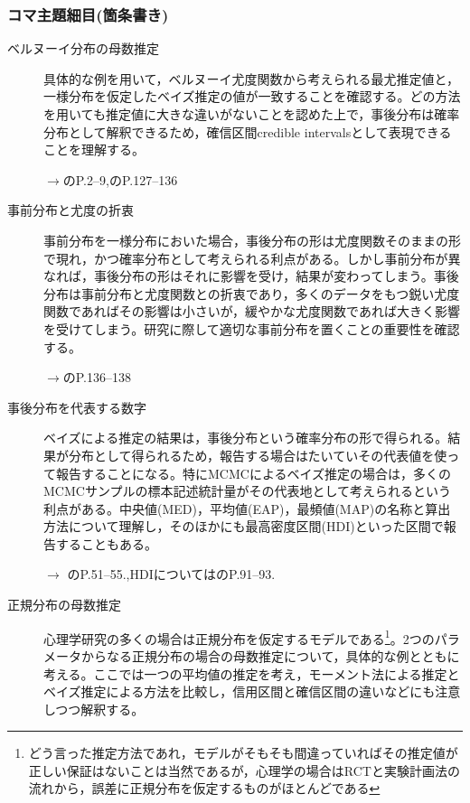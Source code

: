 \subsubsection{コマ主題細目(箇条書き)}
\begin{description}

\item[ベルヌーイ分布の母数推定]具体的な例を用いて，ベルヌーイ尤度関数から考えられる最尤推定値と，一様分布を仮定したベイズ推定の値が一致することを確認する。どの方法を用いても推定値に大きな違いがないことを認めた上で，事後分布は確率分布として解釈できるため，確信区間credible intervalsとして表現できることを理解する。
\begin{flushright}
    $\to$\citet{Lee201709}のP.2--9,\citet{Maeda2017}のP.127--136
\end{flushright}

\item[事前分布と尤度の折衷]事前分布を一様分布においた場合，事後分布の形は尤度関数そのままの形で現れ，かつ確率分布として考えられる利点がある。しかし事前分布が異なれば，事後分布の形はそれに影響を受け，結果が変わってしまう。事後分布は事前分布と尤度関数との折衷であり，多くのデータをもつ鋭い尤度関数であればその影響は小さいが，緩やかな尤度関数であれば大きく影響を受けてしまう。研究に際して適切な事前分布を置くことの重要性を確認する。
\begin{flushright}
    $\to$\citet{Maeda2017}のP.136--138
\end{flushright}

\item[事後分布を代表する数字]ベイズによる推定の結果は，事後分布という確率分布の形で得られる。結果が分布として得られるため，報告する場合はたいていその代表値を使って報告することになる。特にMCMCによるベイズ推定の場合は，多くのMCMCサンプルの標本記述統計量がその代表地として考えられるという利点がある。中央値(MED)，平均値(EAP)，最頻値(MAP)の名称と算出方法について理解し，そのほかにも最高密度区間(HDI)といった区間で報告することもある。
\begin{flushright}
    $\to$ \citet{豊田201506}のP.51--55.,HDIについては\citet{Maeda2017}のP.91--93.
\end{flushright}

\item[正規分布の母数推定]心理学研究の多くの場合は正規分布を仮定するモデルである\footnote{どう言った推定方法であれ，モデルがそもそも間違っていればその推定値が正しい保証はないことは当然であるが，心理学の場合はRCTと実験計画法の流れから，誤差に正規分布を仮定するものがほとんどである}。2つのパラメータからなる正規分布の場合の母数推定について，具体的な例とともに考える。ここでは一つの平均値の推定を考え，モーメント法による推定とベイズ推定による方法を比較し，信用区間と確信区間の違いなどにも注意しつつ解釈する。


\end{description}
